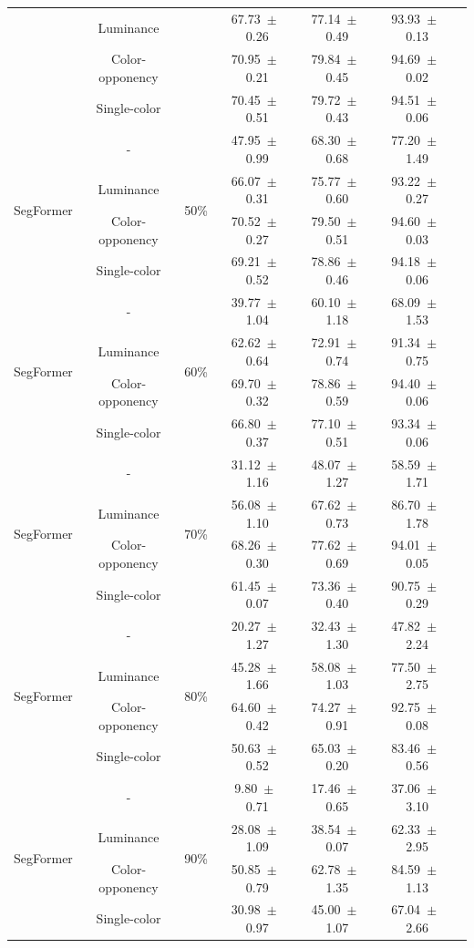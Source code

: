 \begin{table}[h]
\begin{tabular}{@{}lccc ccc@{}}
& Luminance & & 67.73~$\pm$~0.26 & 77.14~$\pm$~0.49 & 93.93~$\pm$~0.13 \\
& Color-opponency & & 70.95~$\pm$~0.21 & 79.84~$\pm$~0.45 & 94.69~$\pm$~0.02 \\
& Single-color & & 70.45~$\pm$~0.51 & 79.72~$\pm$~0.43 & 94.51~$\pm$~0.06 \\
\midrule
\multirow{4}{*}{SegFormer} & - & \multirow{4}{*}{50\%} & 47.95~$\pm$~0.99 & 68.30~$\pm$~0.68 & 77.20~$\pm$~1.49 \\
& Luminance & & 66.07~$\pm$~0.31 & 75.77~$\pm$~0.60 & 93.22~$\pm$~0.27 \\
& Color-opponency & & 70.52~$\pm$~0.27 & 79.50~$\pm$~0.51 & 94.60~$\pm$~0.03 \\
& Single-color & & 69.21~$\pm$~0.52 & 78.86~$\pm$~0.46 & 94.18~$\pm$~0.06 \\
\midrule
\multirow{4}{*}{SegFormer} & - & \multirow{4}{*}{60\%} & 39.77~$\pm$~1.04 & 60.10~$\pm$~1.18 & 68.09~$\pm$~1.53 \\
& Luminance & & 62.62~$\pm$~0.64 & 72.91~$\pm$~0.74 & 91.34~$\pm$~0.75 \\
& Color-opponency & & 69.70~$\pm$~0.32 & 78.86~$\pm$~0.59 & 94.40~$\pm$~0.06 \\
& Single-color & & 66.80~$\pm$~0.37 & 77.10~$\pm$~0.51 & 93.34~$\pm$~0.06 \\
\midrule
\multirow{4}{*}{SegFormer} & - & \multirow{4}{*}{70\%} & 31.12~$\pm$~1.16 & 48.07~$\pm$~1.27 & 58.59~$\pm$~1.71 \\
& Luminance & & 56.08~$\pm$~1.10 & 67.62~$\pm$~0.73 & 86.70~$\pm$~1.78 \\
& Color-opponency & & 68.26~$\pm$~0.30 & 77.62~$\pm$~0.69 & 94.01~$\pm$~0.05 \\
& Single-color & & 61.45~$\pm$~0.07 & 73.36~$\pm$~0.40 & 90.75~$\pm$~0.29 \\
\midrule
\multirow{4}{*}{SegFormer} & - & \multirow{4}{*}{80\%} & 20.27~$\pm$~1.27 & 32.43~$\pm$~1.30 & 47.82~$\pm$~2.24 \\
& Luminance & & 45.28~$\pm$~1.66 & 58.08~$\pm$~1.03 & 77.50~$\pm$~2.75 \\
& Color-opponency & & 64.60~$\pm$~0.42 & 74.27~$\pm$~0.91 & 92.75~$\pm$~0.08 \\
& Single-color & & 50.63~$\pm$~0.52 & 65.03~$\pm$~0.20 & 83.46~$\pm$~0.56 \\
\midrule
\multirow{4}{*}{SegFormer} & - & \multirow{4}{*}{90\%} & 9.80~$\pm$~0.71 & 17.46~$\pm$~0.65 & 37.06~$\pm$~3.10 \\
& Luminance & & 28.08~$\pm$~1.09 & 38.54~$\pm$~0.07 & 62.33~$\pm$~2.95 \\
& Color-opponency & & 50.85~$\pm$~0.79 & 62.78~$\pm$~1.35 & 84.59~$\pm$~1.13 \\
& Single-color & & 30.98~$\pm$~0.97 & 45.00~$\pm$~1.07 & 67.04~$\pm$~2.66 \\
\midrule
\bottomrule
\end{tabular}
\label{tab:sparse_results_segformer_cityscapes}
\end{table}